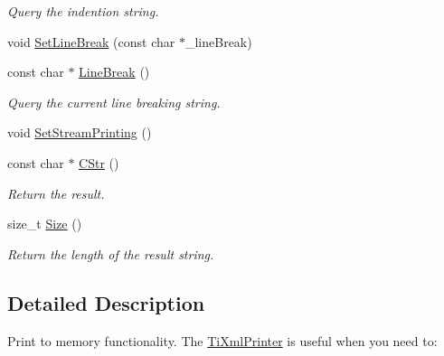 \begin{DoxyCompactItemize}
\begin{DoxyCompactList}\small\item\em \-Query the indention string. \end{DoxyCompactList}\item 
void \hyperlink{class_ti_xml_printer_a4be1e37e69e3858c59635aa947174fe6}{\-Set\-Line\-Break} (const char $\ast$\-\_\-line\-Break)
\item 
\hypertarget{class_ti_xml_printer_a11f1b4804a460b175ec244eb5724d96d}{
const char $\ast$ \hyperlink{class_ti_xml_printer_a11f1b4804a460b175ec244eb5724d96d}{\-Line\-Break} ()}
\label{class_ti_xml_printer_a11f1b4804a460b175ec244eb5724d96d}

\begin{DoxyCompactList}\small\item\em \-Query the current line breaking string. \end{DoxyCompactList}\item 
void \hyperlink{class_ti_xml_printer_ab23a90629e374cb1cadca090468bbd19}{\-Set\-Stream\-Printing} ()
\item 
\hypertarget{class_ti_xml_printer_a859eede9597d3e0355b77757be48735e}{
const char $\ast$ \hyperlink{class_ti_xml_printer_a859eede9597d3e0355b77757be48735e}{\-C\-Str} ()}
\label{class_ti_xml_printer_a859eede9597d3e0355b77757be48735e}

\begin{DoxyCompactList}\small\item\em \-Return the result. \end{DoxyCompactList}\item 
\hypertarget{class_ti_xml_printer_ad01375ae9199bd2f48252eaddce3039d}{
size\-\_\-t \hyperlink{class_ti_xml_printer_ad01375ae9199bd2f48252eaddce3039d}{\-Size} ()}
\label{class_ti_xml_printer_ad01375ae9199bd2f48252eaddce3039d}

\begin{DoxyCompactList}\small\item\em \-Return the length of the result string. \end{DoxyCompactList}\end{DoxyCompactItemize}


\subsection{\-Detailed \-Description}
\-Print to memory functionality. \-The \hyperlink{class_ti_xml_printer}{\-Ti\-Xml\-Printer} is useful when you need to\-:


